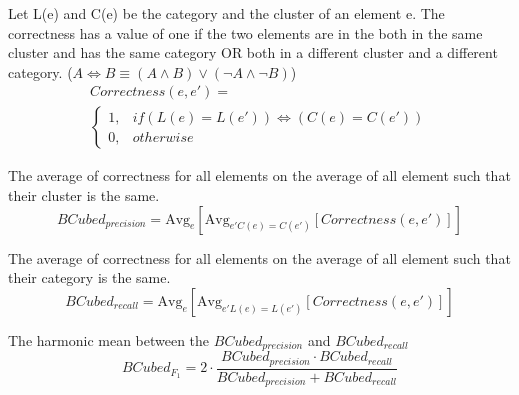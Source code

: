 \begin{definition}
  Let L(e) and C(e) be the category and the cluster of an element e.
  The correctness has a value of one if the two elements are in the both in the same cluster and has the same category OR both in a different cluster and a different category. ($A \Longleftrightarrow B \equiv (A \land B) \lor (\neg A \land \neg B)$)
  \begin{gather*}
    Correctness(e, e') = \\
    \begin{cases}
      1, & if (L(e) = L(e')) \Longleftrightarrow (C(e) = C(e'))\\
      0, & otherwise
    \end{cases}
  \end{gather*}
\end{definition}

\begin{definition}
  The average of correctness for all elements on the average of all element such that their cluster is the same.
  \begin{equation}
    BCubed_{precision} = \text{Avg}_{e}[\text{Avg}_{e' C(e)=C(e')}[Correctness(e, e')]]
  \end{equation}
\end{definition}

\begin{definition}
  The average of correctness for all elements on the average of all element such that their category is the same.
  \begin{equation}
    BCubed_{recall} = \text{Avg}_{e}[\text{Avg}_{e' L(e)=L(e')}[Correctness(e, e')]]
  \end{equation}
\end{definition}

\begin{definition}
  The harmonic mean between the $BCubed_{precision}$ and $BCubed_{recall}$
  \begin{equation}
    BCubed_{F_1} =
    2 \cdot \frac{BCubed_{precision} \cdot BCubed_{recall}}
    {BCubed_{precision} + BCubed_{recall}}
  \end{equation}
\end{definition}
